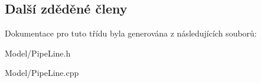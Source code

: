 \subsection*{Další zděděné členy}


Dokumentace pro tuto třídu byla generována z následujících souborů\-:\begin{DoxyCompactItemize}
\item 
Model/Pipe\-Line.\-h\item 
Model/Pipe\-Line.\-cpp\end{DoxyCompactItemize}
